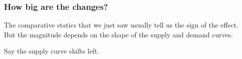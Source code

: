 \documentclass[xcolor=pdftex,dvipsnames]{beamer}
\begin{document}
\begin{frame}
\frametitle{How big are the changes?}
The comparative statics that we just saw usually tell us the sign of
the effect. But the magnitude depends on the shape of the supply and
demand curves. 
\bigskip


Say the supply curve shifts left.





\end{frame}
\end{document}
